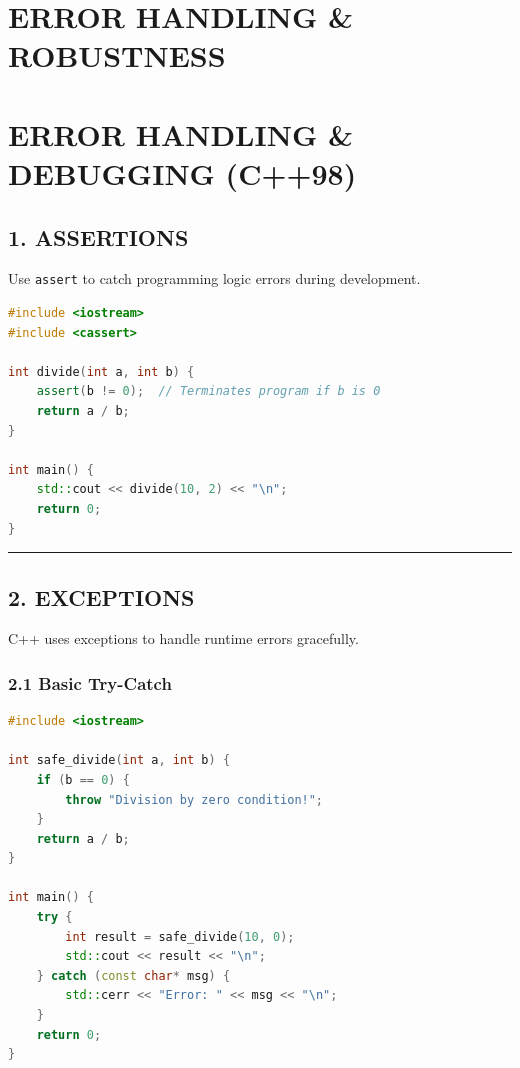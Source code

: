 \hypertarget{error-handling-robustness}{%
\chapter{ERROR HANDLING \& ROBUSTNESS}\label{error-handling-robustness}}

\hypertarget{error-handling-debugging-c98}{%
\chapter{ERROR HANDLING \& DEBUGGING
(C++98)}\label{error-handling-debugging-c98}}

\hypertarget{assertions}{%
\section{1. ASSERTIONS}\label{assertions}}

Use \passthrough{\lstinline!assert!} to catch programming logic errors
during development.

\begin{lstlisting}[language={C++}]
#include <iostream>
#include <cassert>

int divide(int a, int b) {
    assert(b != 0);  // Terminates program if b is 0
    return a / b;
}

int main() {
    std::cout << divide(10, 2) << "\n";
    return 0;
}
\end{lstlisting}

\begin{center}\rule{0.5\linewidth}{0.5pt}\end{center}

\hypertarget{exceptions}{%
\section{2. EXCEPTIONS}\label{exceptions}}

C++ uses exceptions to handle runtime errors gracefully.

\hypertarget{basic-try-catch}{%
\subsection{2.1 Basic Try-Catch}\label{basic-try-catch}}

\begin{lstlisting}[language={C++}]
#include <iostream>

int safe_divide(int a, int b) {
    if (b == 0) {
        throw "Division by zero condition!";
    }
    return a / b;
}

int main() {
    try {
        int result = safe_divide(10, 0);
        std::cout << result << "\n";
    } catch (const char* msg) {
        std::cerr << "Error: " << msg << "\n";
    }
    return 0;
}
\end{lstlisting}

